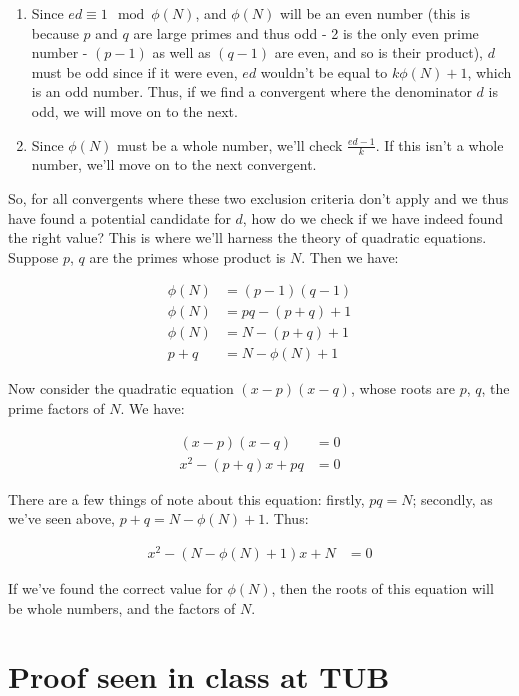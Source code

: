 \documentclass{article}
\begin{document}
\begin{enumerate}
    \item Since $ed \equiv 1 \mod \phi(N)$, and $\phi(N)$ will be an even number (this is because $p$ and $q$ are large primes and thus odd - 2 is the only even prime number - $(p-1)$ as well as $(q-1)$ are even, and so is their product), $d$ must be odd since if it were even, $ed$ wouldn't be equal to $k\phi(N) + 1$, which is an odd number. Thus, if we find a convergent where the denominator $d$ is odd, we will move on to the next.
    \item Since $\phi(N)$ must be a whole number, we'll check $\frac{ed-1}{k}$. If this isn't a whole number, we'll move on to the next convergent.
\end{enumerate}

So, for all convergents where these two exclusion criteria don't apply and we thus have found a potential candidate for $d$, how do we check if we have indeed found the right value? This is where we'll harness the theory of quadratic equations. Suppose $p$, $q$ are the primes whose product is $N$. Then we have:

\begin{align*}
    \phi(N) &= (p-1)(q-1)\\
     \phi(N) &= pq - (p+q) + 1 \\
     \phi(N) &= N - (p+q) + 1 \\
     p+q &= N - \phi(N) + 1
\end{align*}

Now consider the quadratic equation $(x-p)(x-q)$, whose roots are $p$, $q$, the prime factors of $N$. We have:

\begin{align*}
    (x-p)(x-q) &= 0 \\
    x^2 - (p+q)x + pq &= 0
\end{align*}

There are a few things of note about this equation: firstly, $pq=N$; secondly, as we've seen above, $p+q=N-\phi(N)+1$. Thus:

\begin{align*}
    x^2 - (N-\phi(N)+1)x + N &= 0
\end{align*}

If we've found the correct value for $\phi(N)$, then the roots of this equation will be whole numbers, and the factors of $N$.

\section{Proof seen in class at TUB}
\end{document}
